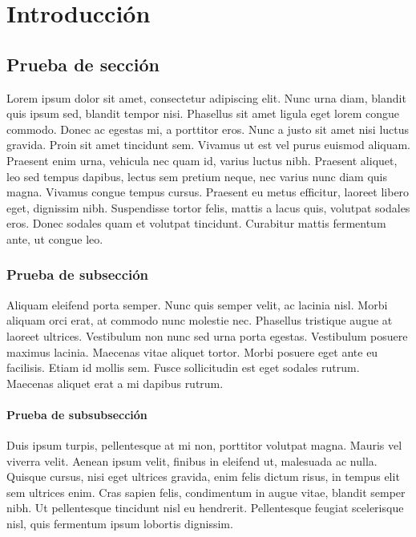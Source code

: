 \chapter{Introducción}

\section{Prueba de sección}

Lorem ipsum dolor sit amet, consectetur adipiscing elit. Nunc urna diam, blandit quis ipsum sed, blandit tempor nisi. Phasellus sit amet ligula eget lorem congue commodo. Donec ac egestas mi, a porttitor eros. Nunc a justo sit amet nisi luctus gravida. Proin sit amet tincidunt sem. Vivamus ut est vel purus euismod aliquam. Praesent enim urna, vehicula nec quam id, varius luctus nibh. Praesent aliquet, leo sed tempus dapibus, lectus sem pretium neque, nec varius nunc diam quis magna. Vivamus congue tempus cursus. Praesent eu metus efficitur, laoreet libero eget, dignissim nibh. Suspendisse tortor felis, mattis a lacus quis, volutpat sodales eros. Donec sodales quam et volutpat tincidunt. Curabitur mattis fermentum ante, ut congue leo.

\subsection{Prueba de subsección}

Aliquam eleifend porta semper. Nunc quis semper velit, ac lacinia nisl. Morbi aliquam orci erat, at commodo nunc molestie nec. Phasellus tristique augue at laoreet ultrices. Vestibulum non nunc sed urna porta egestas. Vestibulum posuere maximus lacinia. Maecenas vitae aliquet tortor. Morbi posuere eget ante eu facilisis. Etiam id mollis sem. Fusce sollicitudin est eget sodales rutrum. Maecenas aliquet erat a mi dapibus rutrum.

\subsubsection{Prueba de subsubsección}

Duis ipsum turpis, pellentesque at mi non, porttitor volutpat magna. Mauris vel viverra velit. Aenean ipsum velit, finibus in eleifend ut, malesuada ac nulla. Quisque cursus, nisi eget ultrices gravida, enim felis dictum risus, in tempus elit sem ultrices enim. Cras sapien felis, condimentum in augue vitae, blandit semper nibh. Ut pellentesque tincidunt nisl eu hendrerit. Pellentesque feugiat scelerisque nisl, quis fermentum ipsum lobortis dignissim.

